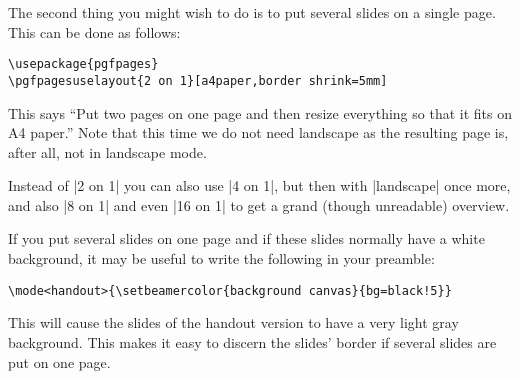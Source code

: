 The second thing you might wish to do is to put several slides on a single page. This can be done as follows:
\begin{verbatim}
\usepackage{pgfpages}
\pgfpagesuselayout{2 on 1}[a4paper,border shrink=5mm]
\end{verbatim}
This says ``Put two pages on one page and then resize everything so that it fits on A4 paper.'' Note that this time we do not need landscape as the resulting page is, after all, not in landscape mode.

Instead of |2 on 1| you can also use |4 on 1|, but then with |landscape| once more, and also |8 on 1| and even |16 on 1| to get a grand (though unreadable) overview.

If you put several slides on one page and if these slides normally have a white background, it may be useful to write the following in your preamble:
\begin{verbatim}
\mode<handout>{\setbeamercolor{background canvas}{bg=black!5}}
\end{verbatim}
This will cause the slides of the handout version to have a very light gray background. This makes it easy to discern the slides' border if several slides are put on one page.






